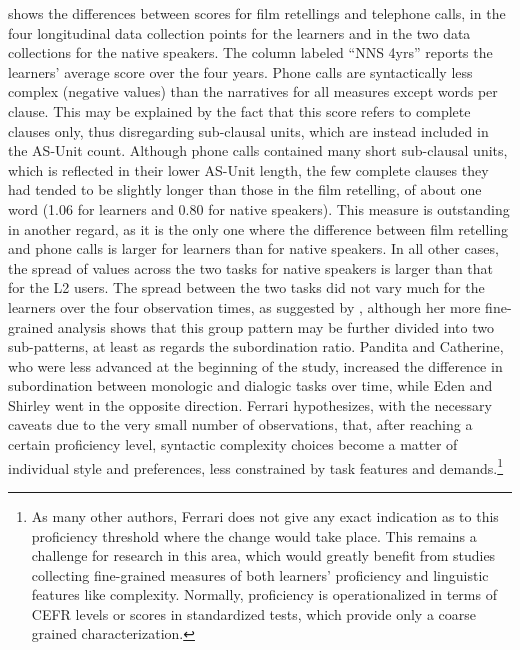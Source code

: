 \documentclass[output=paper]{langscibook}
\begin{document}
 shows the differences between scores for film retellings and telephone calls, in the four longitudinal data collection points for the learners and in the two data collections for the native speakers. The column labeled “NNS 4yrs” reports the learners’ average score over the four years. Phone calls are syntactically less complex (negative values) than the narratives for all measures except words per clause. This may be explained by the fact that this score refers to complete clauses only, thus disregarding sub-clausal units, which are instead included in the AS-Unit count. Although phone calls contained many short sub-clausal units, which is reflected in their lower AS-Unit length, the few complete clauses they had tended to be slightly longer than those in the film retelling, of about one word (1.06 for learners and 0.80 for native speakers). This measure is outstanding in another regard, as it is the only one where the difference between film retelling and phone calls is larger for learners than for native speakers. In all other cases, the spread of values across the two tasks for native speakers is larger than that for the L2 users. The spread between the two tasks did not vary much for the learners over the four observation times, as suggested by \citet{Ferrari2012}, although her more fine-grained analysis shows that this group pattern may be further divided into two sub-patterns, at least as regards the subordination ratio. Pandita and Catherine, who were less advanced at the beginning of the study, increased the difference in subordination between monologic and dialogic tasks over time, while Eden and Shirley went in the opposite direction. Ferrari hypothesizes, with the necessary caveats due to the very small number of observations, that, after reaching a certain proficiency level, syntactic complexity choices become a matter of individual style and preferences, less constrained by task features and demands.\footnote{As many other authors, Ferrari does not give any exact indication as to this proficiency threshold where the change would take place. This remains a challenge for research in this area, which would greatly benefit from studies collecting fine-grained measures of both learners’ proficiency and linguistic features like complexity. Normally, proficiency is operationalized in terms of CEFR levels or scores in standardized tests, which provide only a coarse grained characterization.}
\end{document}
